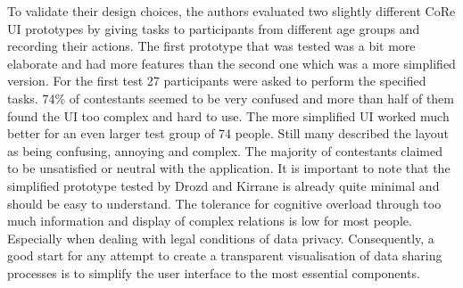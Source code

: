   To validate their design choices, the authors evaluated two slightly different CoRe UI prototypes by giving tasks to participants from different age groups and recording their actions. The first prototype that was tested was a bit more elaborate and had more features than the second one which was a more simplified version. For the first test 27 participants were asked to perform the specified tasks. 74\% of contestants seemed to be very confused and more than half of them found the UI too complex and hard to use. The more simplified UI worked much better for an even larger test group of 74 people. Still many described the layout as being confusing, annoying and complex. The majority of contestants claimed to be unsatisfied or neutral with the application.
  It is important to note that the simplified prototype tested by Drozd and Kirrane is already quite minimal and should be easy to understand. The tolerance for cognitive overload through too much information and display of complex relations is low for most people. Especially when dealing with legal conditions of data privacy. Consequently, a good start for any attempt to create a transparent visualisation of data sharing processes is to simplify the user interface to the most essential components. 
